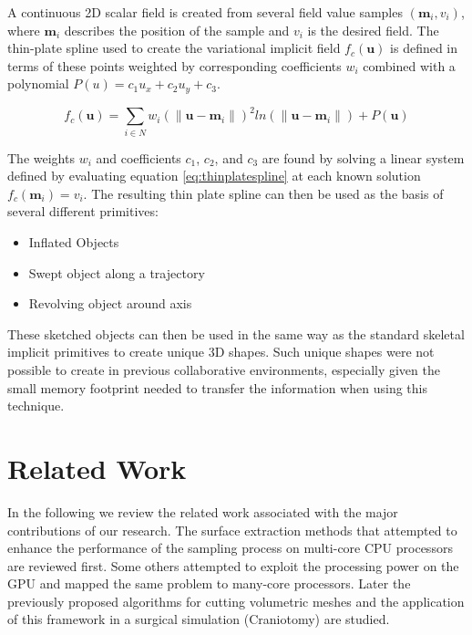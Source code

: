 A continuous 2D scalar field is created from several field value samples $(\mathbf{m}_i, v_i)$, where $\mathbf{m}_i$ describes the 
position of the sample and $v_i$ is the desired field. The thin-plate spline used to create the variational 
implicit field $f_c(\mathbf{u})$ is defined in terms of these points weighted by corresponding coefficients $w_i$ combined with a polynomial 
$P(u) = c_1u_x +c_2u_y +c_3$.

\begin{equation}
f_c(\mathbf{u}) = \sum_{i \in N} w_i(\|\mathbf{u}-\mathbf{m}_i\|)^2ln(\|\mathbf{u}-\mathbf{m}_i\|)+P(\mathbf{u}) 
\label{eq:thinplatespline}
\end{equation}

The weights $w_i$ and coefficients $c_1$, $c_2$, and $c_3$ are found by solving a linear system defined by evaluating 
equation \ref{eq:thinplatespline} at each known solution $f_c(\mathbf{m}_i)=v_i$.
The resulting thin plate spline can then be used as the basis of several different primitives:

\begin{itemize}
 \item Inflated Objects
 \item Swept object along a trajectory
 \item Revolving object around axis
\end{itemize}

These sketched objects can then be used in the same way as the standard skeletal implicit primitives to create unique 3D shapes. Such 
unique shapes were not possible to create in previous collaborative environments, especially given the small memory footprint 
needed to transfer the information when using this technique.



\section{Related Work}
\label{sec:relatedwork}

In the following we review the related work associated with the major contributions of our research. 
The surface extraction methods that attempted to enhance the performance of the 
sampling process on multi-core CPU processors are reviewed first. Some others attempted to exploit the processing 
power on the GPU and mapped the same problem to many-core processors. Later 
the previously proposed algorithms for cutting volumetric meshes and the application of this framework 
in a surgical simulation (Craniotomy) are studied. 


